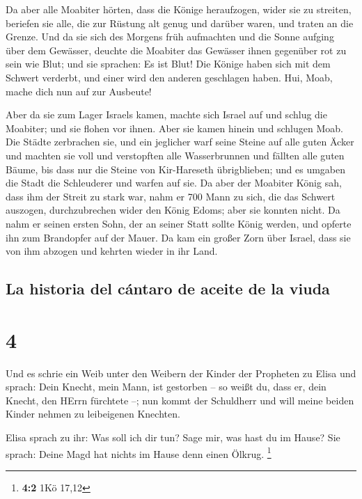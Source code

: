  Da aber alle Moabiter hörten, dass die Könige
heraufzogen, wider sie zu streiten, beriefen sie alle, die zur Rüstung
alt genug und darüber waren, und traten an die Grenze. 
Und da sie sich des Morgens früh aufmachten und die Sonne aufging über
dem Gewässer, deuchte die Moabiter das Gewässer ihnen gegenüber rot zu
sein wie Blut;  und sie sprachen: Es ist Blut! Die Könige
haben sich mit dem Schwert verderbt, und einer wird den anderen
geschlagen haben. Hui, Moab, mache dich nun auf zur Ausbeute!

 Aber da sie zum Lager Israels kamen, machte sich Israel
auf und schlug die Moabiter; und sie flohen vor ihnen. Aber sie kamen
hinein und schlugen Moab.  Die Städte zerbrachen sie, und
ein jeglicher warf seine Steine auf alle guten Äcker und machten sie
voll und verstopften alle Wasserbrunnen und fällten alle guten Bäume,
bis dass nur die Steine von Kir-Hareseth übrigblieben; und es umgaben
die Stadt die Schleuderer und warfen auf sie.  Da aber
der Moabiter König sah, dass ihm der Streit zu stark war, nahm er 700
Mann zu sich, die das Schwert auszogen, durchzubrechen wider den König
Edoms; aber sie konnten nicht.  Da nahm er seinen ersten
Sohn, der an seiner Statt sollte König werden, und opferte ihn zum
Brandopfer auf der Mauer. Da kam ein großer Zorn über Israel, dass sie
von ihm abzogen und kehrten wieder in ihr Land.

\hypertarget{la-historia-del-cuxe1ntaro-de-aceite-de-la-viuda}{%
\subsection{La historia del cántaro de aceite de la
viuda}\label{la-historia-del-cuxe1ntaro-de-aceite-de-la-viuda}}

\hypertarget{section-3}{%
\section{4}\label{section-3}}

 Und es schrie ein Weib unter den Weibern der Kinder der
Propheten zu Elisa und sprach: Dein Knecht, mein Mann, ist gestorben --
so weißt du, dass er, dein Knecht, den HErrn fürchtete --; nun kommt der
Schuldherr und will meine beiden Kinder nehmen zu leibeigenen Knechten.

 Elisa sprach zu ihr: Was soll ich dir tun? Sage mir, was
hast du im Hause? Sie sprach: Deine Magd hat nichts im Hause denn einen
Ölkrug. \footnote{\textbf{4:2} 1Kö 17,12}

